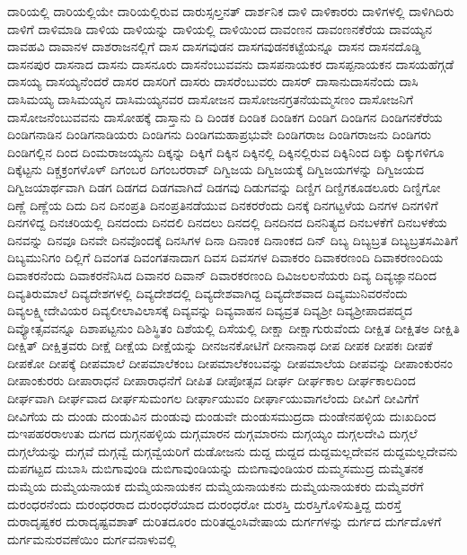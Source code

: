 {ದಾರಿಯಲ್ಲಿ
ದಾರಿಯಲ್ಲಿಯೇ
ದಾರಿಯಲ್ಲಿರುವ
ದಾರುಸ್ಸಲ್ತನತ್
ದಾರ್ಶನಿಕ
ದಾಳಿ
ದಾಳಿಕಾರರು
ದಾಳಿಗಳಲ್ಲಿ
ದಾಳಿಗಿದಿರು
ದಾಳಿಗೆ
ದಾಳಿಮಾಡಿ
ದಾಳಿಯ
ದಾಳಿಯನ್ನು
ದಾಳಿಯಲ್ಲಿ
ದಾಳಿಯಿಂದ
ದಾವಂಣನ
ದಾವಂಣನಕೆರೆಯ
ದಾವಯ್ಯನ
ದಾವಹವಿ
ದಾವಾನಳ
ದಾಶರಾಜನಲ್ಲಿಗೆ
ದಾಸ
ದಾಸಗವುಡನ
ದಾಸಗವುಡನಕಟ್ಟೆಯನ್ನೂ
ದಾಸನ
ದಾಸನದೊಡ್ಡಿ
ದಾಸನಪುರ
ದಾಸನಾದ
ದಾಸನು
ದಾಸನೂರು
ದಾಸನೆಂಬುವವನು
ದಾಸಪನಾಯಕರ
ದಾಸಪ್ಪನಾಯಕನ
ದಾಸಯಹೆಗ್ಗಡೆ
ದಾಸಯ್ಯ
ದಾಸಯ್ಯನೆಂದರೆ
ದಾಸರ
ದಾಸರಿಗೆ
ದಾಸರು
ದಾಸರೆಂಬುವರು
ದಾಸರ್
ದಾಸಾನುದಾಸನೆಂದು
ದಾಸಿ
ದಾಸಿಮಯ್ಯ
ದಾಸಿಮಯ್ಯನ
ದಾಸಿಮಯ್ಯನವರ
ದಾಸೋಜನ
ದಾಸೋಜನಗ್ರತನೆಯಮ್ಮಸಣಂ
ದಾಸೋಜನಿಗೆ
ದಾಸೋಜನೆಂಬುವವನು
ದಾಸೋಹಕ್ಕೆ
ದಾಸ್ತಾನು
ದಿ
ದಿಂಡಕ
ದಿಂಡಿಕ
ದಿಂಡಿಕಗ
ದಿಂಡಿಗ
ದಿಂಡಿಗನ
ದಿಂಡಿಗನಕೆರೆಯ
ದಿಂಡಿಗನಾಡಿನ
ದಿಂಡಿಗನಾಡಿಯರು
ದಿಂಡಿಗನು
ದಿಂಡಿಗಮಹಾಪ್ರಭುವೇ
ದಿಂಡಿಗರಾಜ
ದಿಂಡಿಗರಾಜನು
ದಿಂಡಿಗರು
ದಿಂಡಿಗಲ್ಲಿನ
ದಿಂದ
ದಿಂಮರಾಜಯ್ಯನು
ದಿಕ್ಕನ್ನು
ದಿಕ್ಕಿಗೆ
ದಿಕ್ಕಿನ
ದಿಕ್ಕಿನಲ್ಲಿ
ದಿಕ್ಕಿನಲ್ಲಿರುವ
ದಿಕ್ಕಿನಿಂದ
ದಿಕ್ಕು
ದಿಕ್ಕುಗಳಿಗೂ
ದಿಕ್ಕೆಟ್ಟನು
ದಿಕ್ಚಕ್ರಂಗಳೊಳ್
ದಿಗಂಬರ
ದಿಗಂಬರರಾವ್
ದಿಗ್ವಿಜಯ
ದಿಗ್ವಿಜಯಕ್ಕೆ
ದಿಗ್ವಿಜಯಗಳನ್ನು
ದಿಗ್ವಿಜಯದ
ದಿಗ್ವಿಜಯಾರ್ಥವಾಗಿ
ದಿಡಗ
ದಿಡಗದ
ದಿಡಗವಾಗಿದೆ
ದಿಡಗವು
ದಿಡುಗವನ್ನು
ದಿಣ್ಡಿಗ
ದಿಣ್ಡಿಗಕೂಡಲೂರು
ದಿಣ್ಡಿಗೋ
ದಿಣ್ಣೆ
ದಿಣ್ಣೆಯ
ದಿದು
ದಿನ
ದಿನಂಪ್ರತಿ
ದಿನಂಪ್ರತಿನಡೆಯುವ
ದಿನಕರರೆಂದು
ದಿನಕ್ಕೆ
ದಿನಗಟ್ಟಳೆಯ
ದಿನಗಳ
ದಿನಗಳಿಗೆ
ದಿನಗಳಿದ್ದ
ದಿನಚರಿಯಲ್ಲಿ
ದಿನದಂದು
ದಿನದಲಿ
ದಿನದಲು
ದಿನದಲ್ಲಿ
ದಿನದಿನದ
ದಿನನಿತ್ಯದ
ದಿನಬಳಕೆಗೆ
ದಿನಬಳಕೆಯ
ದಿನವನ್ನು
ದಿನವೂ
ದಿನವೇ
ದಿನವೊಂದಕ್ಕೆ
ದಿನಸಿಗಳ
ದಿನಾ
ದಿನಾಂಕ
ದಿನಾಂಕದ
ದಿನ್
ದಿಬ್ಯ
ದಿಬ್ಯಬ್ರತ
ದಿಬ್ಯಬ್ರತಸಮಿತಿಗೆ
ದಿಬ್ಯಮುನಿಗಂ
ದಿಲ್ಲಿಗೆ
ದಿವಂಗತ
ದಿವಂಗತನಾದಾಗ
ದಿವಸ
ದಿವಸಗಳ
ದಿವಾಕರಂ
ದಿವಾಕರಣಂದಿ
ದಿವಾಕರಣಂದಿಯ
ದಿವಾಕರನೆಂದು
ದಿವಾಕರನೆನಿಸಿದ
ದಿವಾನರ
ದಿವಾನ್
ದಿವಾರಕರಣಂದಿ
ದಿವಿಜಲಲನೆಯರು
ದಿವ್ಯ
ದಿವ್ಯಜ್ಞಾನದಿಂದ
ದಿವ್ಯತಿರುಮಾಲೆ
ದಿವ್ಯದೇಶಗಳಲ್ಲಿ
ದಿವ್ಯದೇಶದಲ್ಲಿ
ದಿವ್ಯದೇಶವಾಗಿದ್ದ
ದಿವ್ಯದೇಶವಾದ
ದಿವ್ಯಮುನಿವರನೆಂದು
ದಿವ್ಯಲಕ್ಷ್ಮೀದೇವಿಯರ
ದಿವ್ಯಲೀಲಾವಿಲಾಸಕ್ಕೆ
ದಿವ್ಯವನ್ನು
ದಿವ್ಯವಾಹನ
ದಿವ್ಯವ್ರತ
ದಿವ್ಯಶ್ರೀ
ದಿವ್ಯಶ್ರೀಪಾದಪದ್ಮದ
ದಿವ್ಯೋತ್ಸವವನ್ನೂ
ದಿಶಾಪಟ್ಟನುಂ
ದಿಶಿಸ್ಥಿತಂ
ದಿಶೆಯಲ್ಲಿ
ದಿಸೆಯಲ್ಲಿ
ದೀಕ್ಷಾ
ದೀಕ್ಷಾಗುರುವೆಂದು
ದೀಕ್ಷಿತ
ದೀಕ್ಷಿತಅ
ದೀಕ್ಷಿತಿ
ದೀಕ್ಷಿತ್
ದೀಕ್ಷಿತ್ರವರು
ದೀಕ್ಷೆ
ದೀಕ್ಷೆಯ
ದೀಕ್ಷೆಯನ್ನು
ದೀನಜನಕೋಟಿಗೆ
ದೀನಾನಾಥ
ದೀಪ
ದೀಪಕ
ದೀಪಕಃ
ದೀಪಕೆ
ದೀಪಕೋ
ದೀಪಕ್ಕೆ
ದೀಪಮಾಲೆ
ದೀಪಮಾಲೆಕಂಬ
ದೀಪಮಾಲೆಕಂಬವನ್ನು
ದೀಪಮಾಲೆಯ
ದೀಪವನ್ನು
ದೀಪಾಂಕುರನಂ
ದೀಪಾಂಕುರರು
ದೀಪಾರಾಧನೆ
ದೀಪಾರಾಧನೆಗೆ
ದೀಪಿತ
ದೀಪೋತ್ಸವ
ದೀರ್ಘ
ದೀರ್ಘಕಾಲ
ದೀರ್ಘಕಾಲದಿಂದ
ದೀರ್ಘವಾಗಿ
ದೀರ್ಘವಾದ
ದೀರ್ಘಸುಮಂಗಲ
ದೀರ್ಘಾಯುವಂ
ದೀರ್ಘಾಯುವಾಗಲೆಂದು
ದೀವಿಗೆ
ದೀವಿಗೆಗೆ
ದೀವಿಗೆಯ
ದು
ದುಂಡು
ದುಂಡುವಿನ
ದುಂಡುವು
ದುಂಡುವೇ
ದುಂಡುಸಮುದ್ರದಾ
ದುಂಡೇನಹಳ್ಳಿಯ
ದುಃಖದಿಂದ
ದುಇಪಹರರಾಉತು
ದುಗದ
ದುಗ್ಗನಹಳ್ಳಿಯ
ದುಗ್ಗಮಾರನ
ದುಗ್ಗಮಾರನು
ದುಗ್ಗಯ್ಯಂ
ದುಗ್ಗಲದೇವಿ
ದುಗ್ಗಲೆ
ದುಗ್ಗಲೆಯನ್ನು
ದುಗ್ಗವೆ
ದುಗ್ಗವ್ವೆ
ದುಗ್ಗವ್ವೆಯರಿಗೆ
ದುಡೋಜನು
ದುದ್ದ
ದುದ್ದದ
ದುದ್ದಮಲ್ಲದೇವನ
ದುದ್ದಮಲ್ಲದೇವನು
ದುಪಗಟ್ಟದ
ದುಬಾಸಿ
ದುಬಿಗಾವುಂಡಿ
ದುಬಿಗಾವುಂಡಿಯನ್ನು
ದುಬಿಗಾವುಂಡಿಯರ
ದುಮ್ಮಸಮುದ್ರ
ದುಮ್ಮೆತನಕ
ದುಮ್ಮೆಯ
ದುಮ್ಮೆಯನಾಯಕ
ದುಮ್ಮೆಯನಾಯಕನ
ದುಮ್ಮೆಯನಾಯಕನು
ದುಮ್ಮೆಯನಾಯಕರು
ದುಮ್ಮೆವರೆಗೆ
ದುರಂಧರನೆಂದು
ದುರಂಧರರಾದ
ದುರಂಧರೆಯಾದ
ದುರಂಧರೋ
ದುರಸ್ತಿ
ದುರಸ್ತಿಗೊಳಿಸುತ್ತಿದ್ದ
ದುರಸ್ತೆ
ದುರಾದೃಷ್ಟಕರ
ದುರಾದೃಷ್ಟವಶಾತ್
ದುರಿತದೂರಂ
ದುರಿತಧ್ವಂಸಿವೇಷಾಯ
ದುರ್ಗಗಳನ್ನು
ದುರ್ಗದ
ದುರ್ಗದೊಳಗೆ
ದುರ್ಗಮನುರವಣೆಯಿಂ
ದುರ್ಗವನಾಳುವಲ್ಲಿ
}
